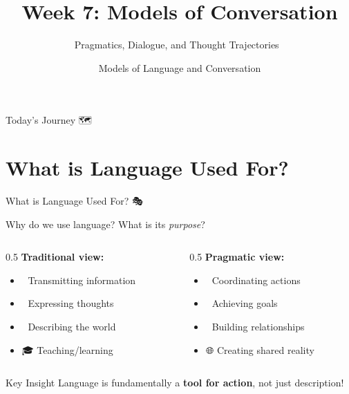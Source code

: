 \documentclass[aspectratio=169]{beamer}
\title{Week 7: Models of Conversation}
\subtitle{Pragmatics, Dialogue, and Thought Trajectories 💬}
\author{Models of Language and Conversation}
\institute{Dr. Jeremy R. Manning}
\date{}
\begin{document}
\begin{frame}
    \titlepage
\end{frame}

\begin{frame}{Today's Journey 🗺️}
    \tableofcontents
\end{frame}

\section{What is Language Used For?}

\begin{frame}[shrink=10]{What is Language Used For? 🎭}
\small
    \begin{discussion}
        Why do we use language? What is its \textit{purpose}?
    \end{discussion}

    \vspace{0.3cm}

    \begin{columns}[T]
        \begin{column}{0.5\textwidth}
            \textbf{Traditional view:}
            \begin{itemize}\setlength{\itemsep}{0pt}
                \item 📢 Transmitting information
                \item 🧠 Expressing thoughts
                \item 📝 Describing the world
                \item 🎓 Teaching/learning
            \end{itemize}
        \end{column}

        \begin{column}{0.5\textwidth}
            \textbf{Pragmatic view:}
            \begin{itemize}\setlength{\itemsep}{0pt}
                \item 🤝 Coordinating actions
                \item 🎯 Achieving goals
                \item 👥 Building relationships
                \item 🌐 Creating shared reality
            \end{itemize}
        \end{column}
    \end{columns}

    \vspace{0.3cm}

    \begin{alertblock}{Key Insight}
        Language is fundamentally a \textbf{tool for action}, not just description!
    \end{alertblock}
\end{frame}
\end{document}

